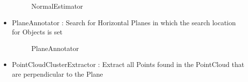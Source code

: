 \documentclass[main.tex]{subfiles}
\begin{document}
\begin{itemize}
\begin{figure}[H]
{			 }%
   			 \caption{NormalEstimator}
  		\end{figure}
	\item PlaneAnnotator : Search for Horizontal Planes in which the search location for Objects is set
		\begin{figure}[H]
   			 \centering
   			 \caption{PlaneAnnotator}
  		\end{figure}
	\item PointCloudClusterExtractor : Extract all Points found in the PointCloud that are perpendicular to the Plane 
		\begin{figure}[H]
   			 \centering

\end{figure}
\end{itemize}
\end{document}
